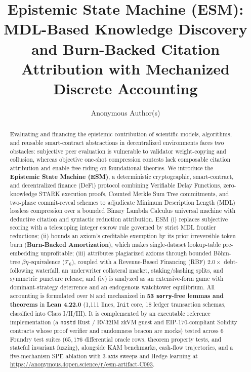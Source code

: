 \documentclass[runningheads,a4paper]{llncs}
\title{Epistemic State Machine (ESM): MDL-Based Knowledge Discovery and Burn-Backed Citation Attribution with Mechanized Discrete Accounting}
\author{Anonymous Author(s)}
\institute{Anonymous Institution}
\renewcommand{\_}{\textunderscore\allowbreak}
\begin{document}
\maketitle
\begin{abstract}
Evaluating and financing the epistemic contribution of scientific models, algorithms, and reusable smart-contract abstractions in decentralized environments faces two obstacles: subjective peer evaluation is vulnerable to validator weight-copying and collusion, whereas objective one-shot compression contests lack composable citation attribution and enable free-riding on foundational theories. We introduce the \textbf{Epistemic State Machine (ESM)}, a deterministic cryptographic, smart-contract, and decentralized finance (DeFi) protocol combining Verifiable Delay Functions, zero-knowledge STARK execution proofs, Counted Merkle Sum Tree commitments, and two-phase commit-reveal schemes to adjudicate Minimum Description Length (MDL) lossless compression over a bounded Binary Lambda Calculus universal machine with deductive citation and syntactic reduction attribution. ESM (i) replaces subjective scoring with a telescoping integer escrow rule governed by strict MDL frontier reductions; (ii) bounds an axiom's creditable exemption by its prior irreversible token burn (\textbf{Burn-Backed Amortization}), which makes single-dataset lookup-table pre-embedding unprofitable; (iii) attributes plagiarized axioms through bounded B\"ohm-tree $\beta\eta$-equivalence ($\mathcal{T}_6$), coupled with a Revenue-Based Financing (RBF) $2.0\times$ debt-following waterfall, an underwriter collateral market, staking/slashing splits, and symmetric puncture release; and (iv) is analyzed as an extensive-form game with dominant-strategy deterrence and an endogenous watchtower equilibrium. All accounting is formulated over $\mathbb{N}$ and mechanized in \textbf{53 \texttt{sorry}-free lemmas and theorems} in \textbf{Lean 4.22.0} (1,111 lines, \texttt{Init} core, 18 ledger transaction schemas, classified into Class I/II/III). It is complemented by an executable reference implementation (a \texttt{no\_std} Rust / RV32IM zkVM guest and EIP-170-compliant Solidity contracts whose proof verifier and randomness beacon are mocks) tested across 6 Foundry test suites ($65{,}176$ differential oracle rows, theorem property tests, and stateful invariant fuzzing), alongside KAM benchmarks, cash-flow trajectories, and a five-mechanism SPE ablation with 3-axis sweeps and Hedge learning at \url{https://anonymous.4open.science/r/esm-artifact-C093}.
\end{abstract}
\end{document}
